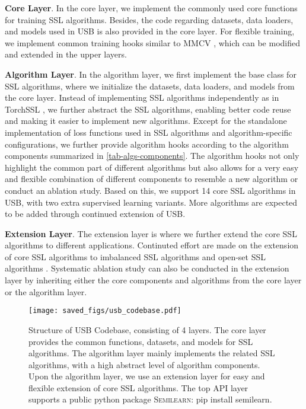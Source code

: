 \documentclass{article}
\begin{document}
\textbf{Core Layer}. In the core layer, we implement the commonly used core functions for training SSL algorithms. Besides, the code regarding datasets, data loaders, and models used in USB is also provided in the core layer. For flexible training, we implement common training hooks similar to MMCV \cite{mmcv}, which can be modified and extended in the upper layers. 

\textbf{Algorithm Layer}. In the algorithm layer, we first implement the base class for SSL algorithms, where we initialize the datasets, data loaders, and models from the core layer. Instead of implementing SSL algorithms independently as in TorchSSL \cite{zhang2021flexmatch}, we further abstract the SSL algorithms, enabling better code reuse and making it easier to implement new algorithms.  Except for the standalone implementation of loss functions used in SSL algorithms and algorithm-specific configurations, we further provide algorithm hooks according to the algorithm components summarized in \cref{tab-algs-components}. The algorithm hooks not only highlight the common part of different algorithms but also allows for a very easy and flexible combination of different components to resemble a new algorithm or conduct an ablation study. Based on this, we support 14 core SSL algorithms in USB, with two extra supervised learning variants. More algorithms are expected to be added through continued extension of USB.

\textbf{Extension Layer}. The extension layer is where we further extend the core SSL algorithms to different applications. Continuted effort are made on the extension of core SSL algorithms to imbalanced SSL algorithms \cite{kim2020distribution,wang22margin,li2011semi,hyun2020class,wei2021crest,yang2020rethinking,fan2021cossl,oh2021distribution} and open-set SSL algorithms \cite{saito2021openmatch,guo2020safe,yu2020multi,luo2021consistency,huang2021universal}. Systematic ablation study can also be conducted in the extension layer by inheriting either the core components and algorithms from the core layer or the algorithm layer. 

\begin{figure}[t!]
    \centering
    \texttt{[image: saved\_figs/usb\_codebase.pdf]}
    \caption{Structure of USB Codebase, consisting of 4 layers. The core layer provides the common functions, datasets, and models for SSL algorithms. The algorithm layer mainly implements the related SSL algorithms, with a high abstract level of algorithm components. Upon the algorithm layer, we use an extension layer for easy and flexible extension of core SSL algorithms. The top API layer supports a public python package \textsc{Semilearn}: {\ttfamily pip install semilearn}.}
    \label{fig:usb_code}
    \vspace{-.2in}
\end{figure}
\end{document}
